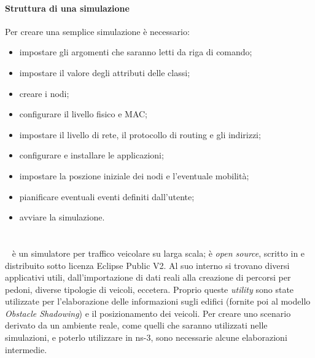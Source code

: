 \paragraph{Struttura di una simulazione}
Per creare una semplice simulazione è necessario:
\begin{itemize}
	\item impostare gli argomenti che saranno letti da riga di comando;
	\item impostare il valore degli attributi delle classi;
	\item creare i nodi;
	\item configurare il livello fisico e MAC;
	\item impostare il livello di rete, il protocollo di routing e gli indirizzi;
	\item configurare e installare le applicazioni;
	\item impostare la poszione iniziale dei nodi e l'eventuale mobilità;
	\item pianificare eventuali eventi definiti dall'utente;
	\item avviare la simulazione.
\end{itemize}
%
\section{\SUMO}\label{sec:sumo}
\SUMO~\cite{SUMO2012} è un simulatore per traffico veicolare su larga scala; è \textit{open source}, scritto in \Cpp
e distribuito sotto licenza Eclipse Public V2.
Al suo interno si trovano diversi applicativi utili, dall'importazione di dati reali alla creazione di percorsi
per pedoni, diverse tipologie di veicoli, eccetera.
Proprio queste \textit{utility} sono state utilizzate per l'elaborazione delle informazioni sugli edifici (fornite poi
al modello \textit{Obstacle Shadowing}) e il posizionamento dei veicoli.
%
Per creare uno scenario derivato da un ambiente reale, come quelli che saranno utilizzati nelle simulazioni,
e poterlo utilizzare in ns-3, sono necessarie alcune elaborazioni intermedie.

